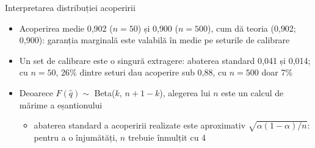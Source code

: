 \begin{frame}{Interpretarea distribuției acoperirii}
\itemsize{\small}
\begin{itemize}
    \item Acoperirea medie 0{,}902 ($n = 50$) și 0{,}900 ($n = 500$), cum dă teoria (0{,}902; 0{,}900): garanția marginală este valabilă în medie pe seturile de calibrare
    \item Un set de calibrare este o singură extragere: abaterea standard 0{,}041 și 0{,}014; cu $n = 50$, 26\% dintre seturi dau acoperire sub 0,88, cu $n = 500$ doar 7\%
    \item Deoarece $F(\hat q) \sim$ Beta($k$, $n + 1 - k$), alegerea lui $n$ este un calcul de mărime a eșantionului
    \begin{itemize}
        \item abaterea standard a acoperirii realizate este aproximativ $\sqrt{\alpha(1 - \alpha)/n}$: pentru a o înjumătăți, $n$ trebuie înmulțit cu 4
    \end{itemize}
\end{itemize}
\end{frame}

